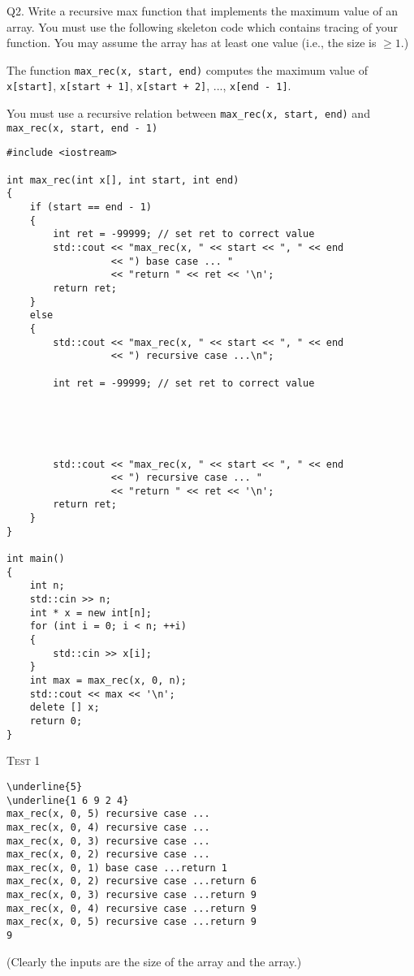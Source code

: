 \newpage
Q2.
Write a recursive max function that implements
the maximum value of an array.
You must use the following skeleton code which
contains tracing of your function.
You may assume the array has at least one value (i.e., the size is $\geq 1$.)

The function
\verb!max_rec(x, start, end)!
computes the maximum value of
\verb!x[start]!, 
\verb!x[start + 1]!, 
\verb!x[start + 2]!, ...,
\verb!x[end - 1]!.

You must use a recursive relation between
\verb!max_rec(x, start, end)!
and
\\
\verb!max_rec(x, start, end - 1)!

\begin{Verbatim}[frame=single, fontsize=\small]
#include <iostream>

int max_rec(int x[], int start, int end)
{
    if (start == end - 1)
    {
        int ret = -99999; // set ret to correct value
        std::cout << "max_rec(x, " << start << ", " << end
                  << ") base case ... "
                  << "return " << ret << '\n';
        return ret;
    }
    else
    {
        std::cout << "max_rec(x, " << start << ", " << end
                  << ") recursive case ...\n";

        int ret = -99999; // set ret to correct value





        std::cout << "max_rec(x, " << start << ", " << end 
                  << ") recursive case ... "
                  << "return " << ret << '\n';
        return ret;        
    }
}

int main()
{
    int n;
    std::cin >> n;
    int * x = new int[n];
    for (int i = 0; i < n; ++i)
    {
        std::cin >> x[i];
    }
    int max = max_rec(x, 0, n);
    std::cout << max << '\n';
    delete [] x;
    return 0;
}
\end{Verbatim}

\textsc{Test 1}
\begin{Verbatim}[commandchars=\\\{\}, fontsize=\small, frame=single]
\underline{5}
\underline{1 6 9 2 4}
max_rec(x, 0, 5) recursive case ...
max_rec(x, 0, 4) recursive case ...
max_rec(x, 0, 3) recursive case ...
max_rec(x, 0, 2) recursive case ...
max_rec(x, 0, 1) base case ...return 1
max_rec(x, 0, 2) recursive case ...return 6
max_rec(x, 0, 3) recursive case ...return 9
max_rec(x, 0, 4) recursive case ...return 9
max_rec(x, 0, 5) recursive case ...return 9
9
\end{Verbatim}
(Clearly the inputs are the size of the array and the array.)

